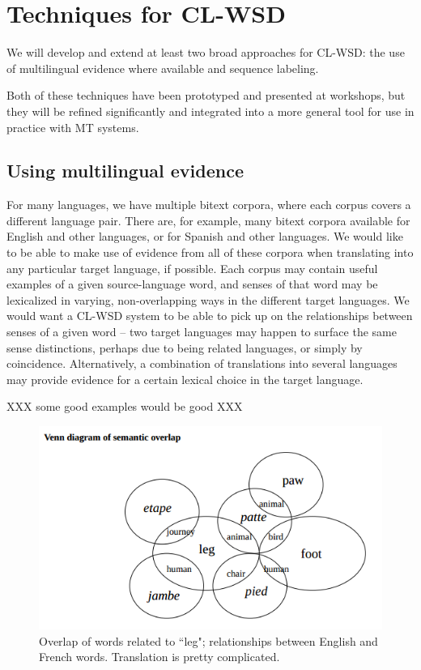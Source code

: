 \section{Techniques for CL-WSD}

We will develop and extend at least two broad approaches for CL-WSD: the use
of multilingual evidence where available and sequence labeling.

Both of these techniques have been prototyped and presented at workshops, but
they will be refined significantly and integrated into a more general tool for
use in practice with MT systems.

\subsection{Using multilingual evidence}
For many languages, we have multiple bitext corpora, where each corpus covers a
different language pair. There are, for example, many bitext corpora available
for English and other languages, or for Spanish and other languages.
We would like to be able to make use of evidence from all of these corpora when
translating into any particular target language, if possible.
Each corpus may contain useful examples of a given source-language word,
and senses of that word may be lexicalized in varying, non-overlapping ways in
the different target languages.
We would want a CL-WSD system to be able to pick up on the relationships
between senses of a given word -- two target languages may happen to surface
the same sense distinctions, perhaps due to being related languages, or simply
by coincidence. Alternatively, a combination of translations into several
languages may provide evidence for a certain lexical choice in the target
language.

XXX some good examples would be good XXX

\begin{figure}
  \includegraphics[width=12cm]{hutchins-leg-etc.png}
  \caption{Overlap of words related to ``leg"; relationships between English
  and French words. Translation is pretty complicated.}
  \label{fig:leg}
\end{figure}


